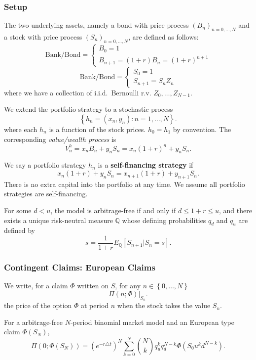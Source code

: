 \subsubsection{Setup}
The two underlying assets, namely a bond with price process
${(B_{n})}_{n=0,\ldots,N}$ and a stock with price process
${(S_{n})}_{n=0,\ldots,N}$, are defined as follows:
\[\text{Bank/Bond}=\begin{cases}B_0=1\\B_{n+1}=(1+r)B_{n}={(1+r)}^{n+1}\end{cases}\] 
\[\text{Bank/Bond}=\begin{cases}S_0=1\\S_{n+1}=S_{n}Z_{n}\end{cases}\] 
where we have a collection of i.i.d.\ Bernoulli r.v. $Z_0,\ldots,Z_{N-1}$.
\begin{definition}
  We extend the portfolio strategy to a stochastic process
  \[\left\{ h_{n}=(x_{n},y_{n}) : n=1,\ldots,N\right\}.\]
  where each $h_{n}$ is a function of the stock prices. $h_0=h_1$ by
  convention. The corresponding \textit{value/wealth process} is
  \[V_{n}^{h}=x_{n}B_{n}+y_{n}S_{n}=x_{n}{(1+r)}^{n}+y_{n}S_{n}.\]
\end{definition}
\begin{definition}
  We say a portfolio strategy $h_{n}$ is a \textbf{self-financing strategy} if
  \[x_{n}(1+r)+y_{n}S_{n}=x_{n+1}(1+r)+y_{n+1}S_{n}.\]
  There is no extra capital into the portfolio at any time. We assume all
  portfolio strategies are self-financing.
\end{definition}
\begin{theorem}
  For some $d<u$, the model is arbitrage-free if and only if $d\le 1+r\le u$,
  and there exists a unique risk-neutral measure $\mathbb{Q}$ whose defining probabilities
  $q_d$ and $q_u$ are defined by
  \[s=\frac{1}{1+r}E_{\mathbb{Q}}\left[ S_{n+1}|S_{n}=s \right].\] 
\end{theorem}
\subsubsection{Contingent Claims: European Claims}
\begin{notation}
  We write, for a claim $\Phi$ written on $S$, for any $n\in \left\{ 0,\ldots,N \right\}$
  \[\left.\Pi\left( n;\Phi \right)\right|_{S_{n}}.\]
  the price of the option $\Phi$ at period $n$ when the stock takes the value
  $S_{n}$.
\end{notation}
\begin{prop}
  For a arbitrage-free $N$-period binomial market model and an European type claim $\Phi(S_N)$,
  \[\Pi\left( 0;\Phi\left( S_N \right)  \right) ={\left( e^{-r\triangle t} \right)}^{N}\sum_{k=0}^{N} \binom{N}{k}q_u^{k}q_d^{N-k}\Phi\left( S_0u^{k}d^{N-k} \right).\] 
\end{prop}

